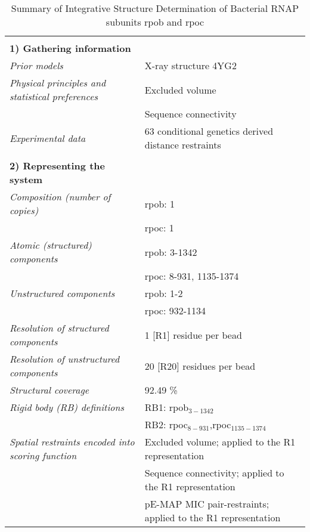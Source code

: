 \documentclass[8pt,a4paper]{article}
\begin{document}
\begin{longtable}{ p{} | p{} } 
\caption{Summary of Integrative Structure Determination of Bacterial RNAP subunits rpob and rpoc}
  
  &  \\
  \textbf{1) Gathering information} & \\
    \hline

            \textit{Prior models} & X-ray structure 4YG2\\
                \textit{Physical principles and statistical preferences} & Excluded volume\\
            & Sequence connectivity \\
                \textit{Experimental data} & 63 conditional genetics derived distance restraints\\
          
    &  \\
    \normalsize{\textbf{2) Representing the system}} & \\
    \hline
    
            \textit{Composition (number of copies)} & rpob: 1\\
            & rpoc: 1 \\
                \textit{Atomic (structured) components} & rpob: 3-1342\\
            & rpoc: 8-931, 1135-1374 \\
                \textit{Unstructured components} & rpob: 1-2\\
            & rpoc: 932-1134 \\
                \textit{Resolution of structured components} & 1 [R1] residue per bead\\
                \textit{Resolution of unstructured components} & 20 [R20] residues per bead\\
                \textit{Structural coverage} & 92.49 \%\\
                \textit{Rigid body (RB) definitions} & RB1: rpob$_{3-1342}$\\
            & RB2: rpoc$_{8-931}$,rpoc$_{1135-1374}$ \\
                \textit{Spatial restraints encoded into scoring function} & Excluded volume; applied to the R1 representation\\
            & Sequence connectivity; applied to the R1 representation \\
            & pE-MAP MIC pair-restraints; applied to the R1 representation \\
          



\end{longtable}
\end{document}
